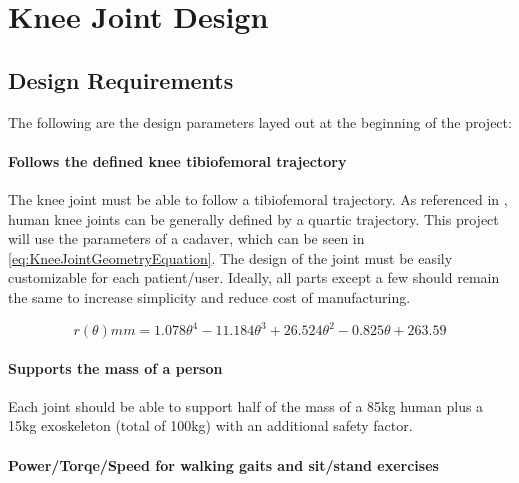 \chapter{Knee Joint Design}



\section{Design Requirements}
\label{sec:DesignParams}
The following are the design parameters layed out at the beginning of the project:

\subsubsection{Follows the defined knee tibiofemoral trajectory}
The knee joint must be able to follow a tibiofemoral trajectory. As referenced in \cite{KinDynKneeJoint}, human knee joints can be generally defined by a quartic trajectory. This project will use the parameters of a cadaver, which can be seen in \autoref{eq:KneeJointGeometryEquation}. The design of the joint must be easily customizable for each patient/user. Ideally, all parts except a few should remain the same to increase simplicity and reduce cost of manufacturing.

\begin{equation}
    r(\theta) mm = 1.078\theta^4 - 11.184\theta^3 + 26.524\theta^2 - 0.825\theta + 263.59
    \label{eq:KneeJointGeometryEquation}
\end{equation}

\subsubsection{Supports the mass of a person}
Each joint should be able to support half of the mass of a 85kg human plus a 15kg exoskeleton (total of 100kg) with an additional safety factor. 

\subsubsection{Power/Torqe/Speed for walking gaits and sit/stand exercises}

